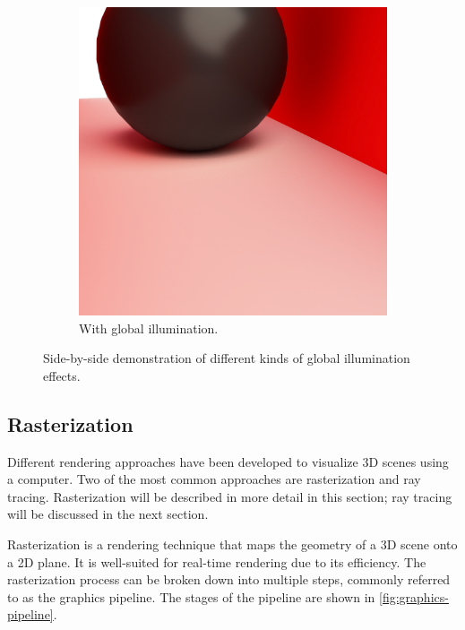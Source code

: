 \begin{figure}[H]
\begin{subfigure}[b]{0.3\textwidth}
    \includegraphics[width=\textwidth]{resources/global-illumination-demonstration.png}
    \caption{With global illumination.}
    \label{fig:global-illumination-demo-good}
  \end{subfigure}
  \hspace*{1.8cm}
  \caption{Side-by-side demonstration of different kinds of global illumination effects.}
  \label{fig:global-illumination-demo}
\end{figure}

\subsection{Rasterization}
\label{ch:rasterizationTheory}

Different rendering approaches have been developed to visualize 3D scenes using a computer. Two of the most common approaches are rasterization and ray tracing. Rasterization will be described in more detail in this section; ray tracing will be discussed in the next section.

Rasterization is a rendering technique that maps the geometry of a 3D scene onto a 2D plane. It is well-suited for real-time rendering due to its efficiency. The rasterization process can be broken down into multiple steps, commonly referred to as the graphics pipeline. The stages of the pipeline are shown in \autoref{fig:graphics-pipeline}.


